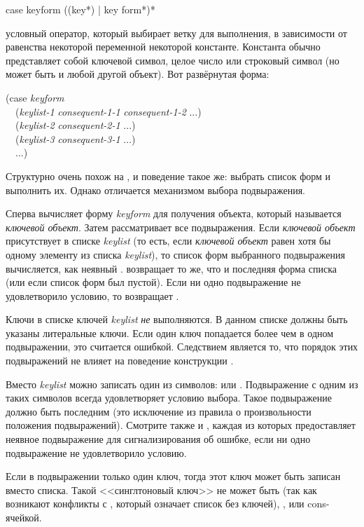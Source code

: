 \begin{defmac}
case keyform {({({key}*) | key} {form}*)}*

 условный оператор, который выбирает ветку для выполнения, в
зависимости от равенства некоторой переменной некоторой константе. Константа
обычно представляет собой ключевой символ, целое число или строковый символ (но
может быть и любой другой объект). Вот развёрнутая форма:
\begin{lisp}
(case \emph{keyform} \\
~~(\emph{keylist-1} \emph{consequent-1-1} \emph{consequent-1-2} ...) \\
~~(\emph{keylist-2} \emph{consequent-2-1} ...) \\
~~(\emph{keylist-3} \emph{consequent-3-1} ...) \\
~~...)
\end{lisp}
Структурно  очень похож на , и поведение такое же: выбрать
список форм и выполнить их.
Однако  отличается механизмом выбора подвыражения.

Сперва  вычисляет форму \emph{keyform} для получения объекта, который
называется \emph{ключевой объект}.
Затем  рассматривает все подвыражения. Если \emph{ключевой объект}
присутствует в списке \emph{keylist} (то есть, если \emph{ключевой объект} равен
 хотя бы одному элементу из списка \emph{keylist}), то список форм
выбранного подвыражения вычисляется, как неявный .
 возвращает то же, что и последняя форма списка (или {\false} если
список форм был пустой).
Если ни одно подвыражение не удовлетворило условию, то  возвращает
{\false}.

Ключи в списке ключей \emph{keylist} \emph{не} выполняются. В данном списке
должны быть указаны литеральные ключи.
Если один ключ попадается более чем в одном подвыражении, это считается
ошибкой.
Следствием является то, что порядок этих подвыражений не влияет на поведение
конструкции .

Вместо \emph{keylist} можно записать один из символов: {\true} или
. Подвыражение с одним из таких символов всегда удовлетворяет
условию выбора. Такое подвыражение должно быть последним (это исключение из
правила о произвольности положения подвыражений).
Смотрите также  и , каждая из которых предоставляет
неявное  подвыражение для сигнализирования об ошибке, если ни
одно подвыражение не удовлетворило условию.

Если в подвыражении только один ключ, тогда этот ключ может быть записан вместо
списка.
Такой <<синглтоновый ключ>> не может быть {\nil} (так как возникают конфликты с
{\emptylist}, который означает список без ключей), {\true},  или
cons-ячейкой.
\end{defmac}

